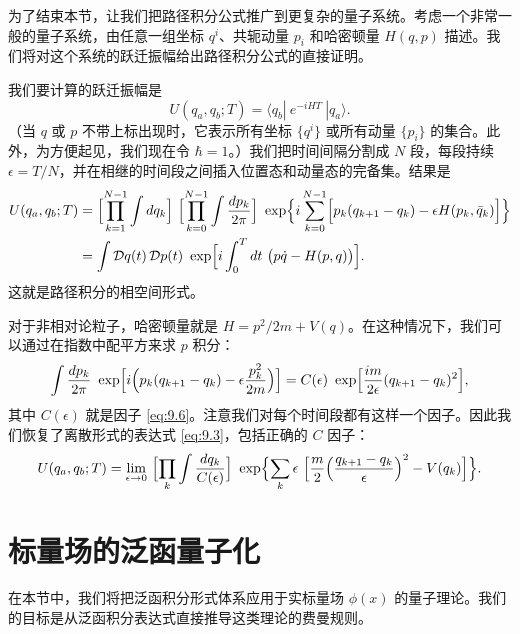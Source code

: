为了结束本节，让我们把路径积分公式推广到更复杂的量子系统。考虑一个非常一般的量子系统，由任意一组坐标 $q^i$、共轭动量 $p_i$ 和哈密顿量 $H(q,p)$ 描述。我们将对这个系统的跃迁振幅给出路径积分公式的直接证明。

我们要计算的跃迁振幅是
\begin{equation}
  U(q_a, q_b; T) = \langle q_b|\ e^{-iHT}\ |q_a\rangle .
  \label{eq:9.8}
\end{equation}
（当 $q$ 或 $p$ 不带上标出现时，它表示所有坐标 $\{q^i\}$ 或所有动量 $\{p_i\}$ 的集合。此外，为方便起见，我们现在令 $\hbar = 1$。）我们把时间间隔分割成 $N$ 段，每段持续 $\epsilon = T/N$，并在相继的时间段之间插入位置态和动量态的完备集。结果是
\begin{equation}
  \begin{aligned}
    U(q_a, q_b; T) &= \Bigl[ \prod_{k=1}^{N-1}\int dq_k \Bigr]\
      \Bigl[ \prod_{k=0}^{N-1}\int \frac{dp_k}{2\pi} \Bigr]\
      \exp\Bigl\{ i\sum_{k=0}^{N-1}\Bigl[ p_k(q_{k+1}-q_k)
        - \epsilon H(p_k, \bar{q}_k) \Bigr] \Bigr\}\\
    &= \int \mathcal{D}q(t)\,\mathcal{D}p(t)\ \exp\Bigl[ i\int_0^T dt\
      \bigl( p\dot{q} - H(p,q) \bigr) \Bigr] .
  \end{aligned}
  \label{eq:9.12}
\end{equation}
这就是路径积分的相空间形式。

对于非相对论粒子，哈密顿量就是 $H = p^2/2m + V(q)$。在这种情况下，我们可以通过在指数中配平方来求 $p$ 积分：
\begin{equation}
  \int \frac{dp_k}{2\pi}\ \exp\Bigl[ i\Bigl( p_k(q_{k+1}-q_k)
    - \epsilon\frac{p_k^2}{2m} \Bigr) \Bigr]
  = C(\epsilon)\ \exp\Bigl[ \frac{im}{2\epsilon}(q_{k+1}-q_k)^2 \Bigr] ,
\end{equation}
其中 $C(\epsilon)$ 就是因子 \eqref{eq:9.6}。注意我们对每个时间段都有这样一个因子。因此我们恢复了离散形式的表达式 \eqref{eq:9.3}，包括正确的 $C$ 因子：
\begin{equation}
  U(q_a, q_b; T) = \lim_{\epsilon\to 0}\ \Bigl[ \prod_k
    \int \frac{dq_k}{C(\epsilon)} \Bigr]\
    \exp\Bigl\{ \sum_k \epsilon\ \Bigl[ \frac{m}{2}\Bigl(
      \frac{q_{k+1}-q_k}{\epsilon} \Bigr)^2 - V(q_k) \Bigr] \Bigr\}.
  \label{eq:9.13}
\end{equation}

\section{标量场的泛函量子化}

在本节中，我们将把泛函积分形式体系应用于实标量场 $\phi(x)$ 的量子理论。我们的目标是从泛函积分表达式直接推导这类理论的费曼规则。

